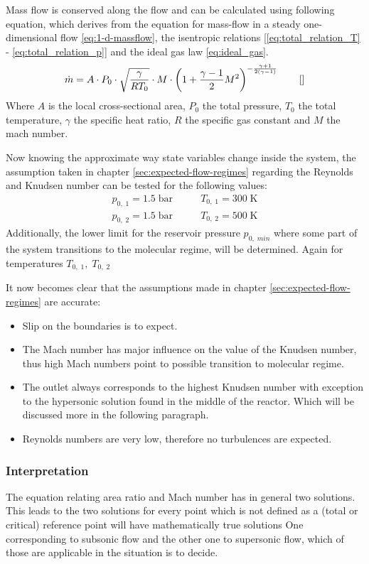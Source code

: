 	
	Mass flow is conserved along the flow and can be calculated using following equation, which derives from the equation for mass-flow in a steady one-dimensional flow \eqref{eq:1-d-massflow}, the isentropic relations [\eqref{eq:total_relation_T} - \eqref{eq:total_relation_p}] and the ideal gas law \eqref{eq:ideal_gas}.
	\cite{benson_mass_nodate}
	$$
		\dot{m} = A \cdot P_0 \cdot \sqrt{\frac{\gamma}{R T_0}} \cdot M \cdot \left(1 + \frac{\gamma - 1}{2} M^2\right)^{-\frac{\gamma + 1}{2(\gamma - 1)}}
		\qquad \eqref{}
	$$
	Where $A$ is the local cross-sectional area, $P_0$ the total pressure, $T_0$ the total temperature, $\gamma$ the specific heat ratio, $R$ the specific gas constant and $M$ the mach number.
	\cite{Cantwell_AA210A}

	Now knowing the approximate way state variables change inside the system, the assumption taken in chapter \ref{sec:expected-flow-regimes} regarding the Reynolds and Knudsen number can be tested for the following values:
	\begin{align*}
		p_{0,\;1} = 1.5\;\text{bar} &\qquad T_{0,\;1} = 300\;\text{K}\\
		p_{0,\;2} = 1.5\;\text{bar} &\qquad T_{0,\;2} = 500\;\text{K}
	\end{align*}
	Additionally, the lower limit for the reservoir pressure $p_{0,\;min}$ where some part of the system transitions to the molecular regime, will be determined.
	Again for temperatures $T_{0,\;1},\;T_{0,\;2}$
	
	\noindent It now becomes clear that the assumptions made in chapter \ref{sec:expected-flow-regimes} are accurate:
	\begin{itemize}
		\item Slip on the boundaries is to expect.
		\item The Mach number has major influence on the value of the Knudsen number, thus high Mach numbers point to possible transition to molecular regime.
		\item The outlet always corresponds to the highest Knudsen number with exception to the hypersonic solution found in the middle of the reactor. Which will be discussed more in the following paragraph.
		\item Reynolds numbers are very low, therefore no turbulences are expected.
	\end{itemize}
\subsubsection*{Interpretation}
	The equation relating area ratio and Mach number has in general two solutions.
	This leads to the two solutions for every point which is not defined as a (total or critical) reference point will have mathematically true solutions
	One corresponding to subsonic flow and the other one to supersonic flow, which of those are applicable in the situation is to decide.

